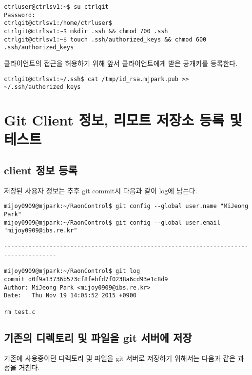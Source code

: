 \documentclass[11pt
  , a4paper
  , article
  , oneside
]{memoir}
\begin{document}
\scriptsize
{
\begin{verbatim}
ctrluser@ctrlsv1:~$ su ctrlgit 
Password: 
ctrlgit@ctrlsv1:/home/ctrluser$ 
ctrlgit@ctrlsv1:~$ mkdir .ssh && chmod 700 .ssh
ctrlgit@ctrlsv1:~$ touch .ssh/authorized_keys && chmod 600 .ssh/authorized_keys
\end{verbatim}
}

클라이언트의 접근을 허용하기 위해 앞서 클라이언트에게 받은 공개키를 등록한다. 

\scriptsize
{
\begin{verbatim}
ctrlgit@ctrlsv1:~/.ssh$ cat /tmp/id_rsa.mjpark.pub >> ~/.ssh/authorized_keys 
\end{verbatim}
}
\chapter{Git Client 정보, 리모트 저장소 등록 및 테스트}
\section{client 정보 등록}
저장된 사용자 정보는 추후 git commit시 다음과 같이 log에 남는다.

\scriptsize
{
\begin{verbatim}
mijoy0909@mjpark:~/RaonControl$ git config --global user.name "MiJeong Park"
mijoy0909@mjpark:~/RaonControl$ git config --global user.email "mijoy0909@ibs.re.kr"

-------------------------------------------------------------------------------------

mijoy0909@mjpark:~/RaonControl$ git log
commit d0f9a13736b573cf8febfd7f0238a6cd93e1c8d9
Author: MiJeong Park <mijoy0909@ibs.re.kr>
Date:   Thu Nov 19 14:05:52 2015 +0900

rm test.c
\end{verbatim}
}

\section{기존의 디렉토리 및 파일을 git 서버에 저장}
기존에 사용중이던 디렉토리 및 파일을 git 서버로 저장하기 위해서는 다음과 같은 과정을 거친다.
\end{document}
